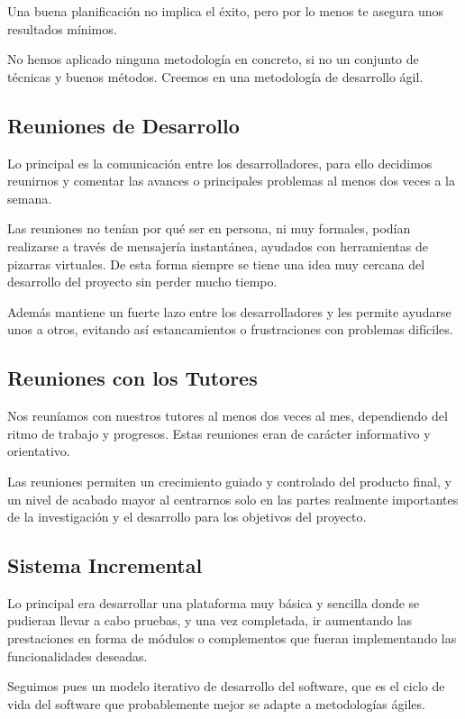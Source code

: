 Una buena planificación no implica el éxito, pero por lo menos te asegura unos
resultados mínimos.

No hemos aplicado ninguna metodología en concreto, si no un conjunto de técnicas
y buenos métodos. Creemos en una metodología de desarrollo ágil.

\subsection{Reuniones de Desarrollo}

Lo principal es la comunicación entre los desarrolladores, para ello decidimos
reunirnos y comentar las avances o principales problemas al menos dos veces a
la semana.

Las reuniones no tenían por qué ser en persona, ni muy formales, podían
realizarse a través de mensajería instantánea, ayudados con herramientas de
pizarras virtuales. De esta forma siempre se tiene una idea muy cercana del
desarrollo del proyecto sin perder mucho tiempo.

Además mantiene un fuerte lazo entre los desarrolladores y les permite ayudarse
unos a otros, evitando así estancamientos o frustraciones con problemas
difíciles.

\subsection{Reuniones con los Tutores}

Nos reuníamos con nuestros tutores al menos dos veces al mes, dependiendo del
ritmo de trabajo y progresos. Estas reuniones eran de carácter informativo y
orientativo.

Las reuniones permiten un crecimiento guiado y controlado del producto final, y
un nivel de acabado mayor al centrarnos solo en las partes realmente importantes
de la investigación y el desarrollo para los objetivos del proyecto.

\subsection{Sistema Incremental}

Lo principal era desarrollar una plataforma muy básica y sencilla donde se
pudieran llevar a cabo pruebas, y una vez completada, ir aumentando las
prestaciones en forma de módulos o complementos que fueran implementando las
funcionalidades deseadas.

Seguimos pues un modelo iterativo de desarrollo del software, que es el ciclo
de vida del software que probablemente mejor se adapte a metodologías ágiles.

